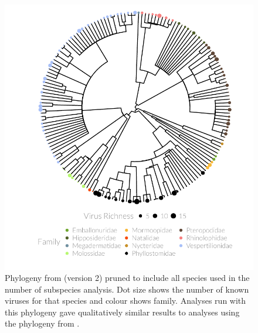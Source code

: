 \begin{knitrout}\footnotesize
{}\color{fgcolor}\begin{figure}[t]

{\centering \includegraphics[width=1\textwidth,trim = 0cm 0cm 0cm 0cm]{figures/A-treePlot2-1} 

}

\caption[Pruned alternative phylogeny with dot size showing number of pathogens and colour showing family.]{
Phylogeny from \textcite{jones2005bats} (version 2) pruned to include all species used in the number of subspecies analysis.
Dot size shows the number of known viruses for that species and colour shows family.
Analyses run with this phylogeny gave qualitatively similar results to analyses using the phylogeny from \cite{bininda2007delayed}.
}\label{fig:treePlot2}
\end{figure}


\end{knitrout}





